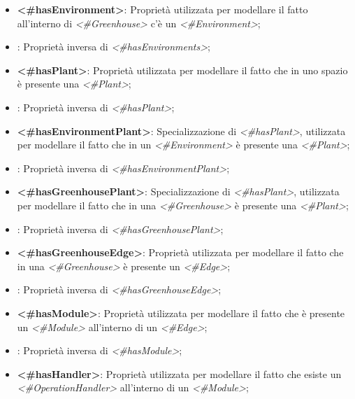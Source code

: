\begin{itemize}
	\item \textbf{<\#hasEnvironment>}: Proprietà utilizzata per modellare il fatto all'interno di \textit{<\#Greenhouse>} c'è un \textit{<\#Environment>};

	\item {}: Proprietà inversa di \textit{<\#hasEnvironments>};

	\item \textbf{<\#hasPlant>}: Proprietà utilizzata per modellare il fatto che in uno spazio è presente una  \textit{<\#Plant>};

	\item {}: Proprietà inversa di \textit{<\#hasPlant>};

	\item \textbf{<\#hasEnvironmentPlant>}: Specializzazione di \textit{<\#hasPlant>}, utilizzata per modellare il fatto che in un \textit{<\#Environment>} è presente una  \textit{<\#Plant>};

	\item {}: Proprietà inversa di \textit{<\#hasEnvironmentPlant>};

	\item \textbf{<\#hasGreenhousePlant>}: Specializzazione di \textit{<\#hasPlant>}, utilizzata per modellare il fatto che in una \textit{<\#Greenhouse>} è presente una  \textit{<\#Plant>};

	\item {}: Proprietà inversa di \textit{<\#hasGreenhousePlant>};

	\item \textbf{<\#hasGreenhouseEdge>}: Proprietà utilizzata per modellare il fatto che in una \textit{<\#Greenhouse>} è presente un \textit{<\#Edge>};

	\item {}: Proprietà inversa di \textit{<\#hasGreenhouseEdge>};

	\item \textbf{<\#hasModule>}: Proprietà utilizzata per modellare il fatto che è presente un \textit{<\#Module>} all'interno di un \textit{<\#Edge>};

	\item {}: Proprietà inversa di \textit{<\#hasModule>};

	\item \textbf{<\#hasHandler>}: Proprietà utilizzata per modellare il fatto che esiste un \textit{<\#OperationHandler>} all'interno di un \textit{<\#Module>};


\end{itemize}
